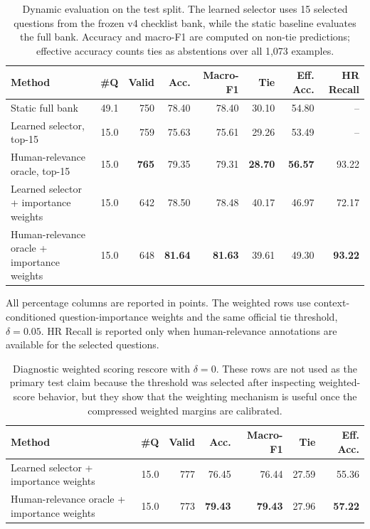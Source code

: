 \begin{table}[t]
\centering
\small
\caption{Dynamic evaluation on the test split. The learned selector uses 15 selected questions from the frozen v4 checklist bank, while the static baseline evaluates the full bank. Accuracy and macro-F1 are computed on non-tie predictions; effective accuracy counts ties as abstentions over all 1,073 examples.}
\label{tab:dynamic-eval-test}
\begin{tabular}{lrrrrrrr}
\toprule
Method & \#Q & Valid & Acc. & Macro-F1 & Tie & Eff. Acc. & HR Recall \\
\midrule
Static full bank & 49.1 & 750 & 78.40 & 78.40 & 30.10 & 54.80 & -- \\
Learned selector, top-15 & 15.0 & 759 & 75.63 & 75.61 & 29.26 & 53.49 & -- \\
Human-relevance oracle, top-15 & 15.0 & \textbf{765} & 79.35 & 79.31 & \textbf{28.70} & \textbf{56.57} & 93.22 \\
\midrule
Learned selector + importance weights & 15.0 & 642 & 78.50 & 78.48 & 40.17 & 46.97 & 72.17 \\
Human-relevance oracle + importance weights & 15.0 & 648 & \textbf{81.64} & \textbf{81.63} & 39.61 & 49.30 & \textbf{93.22} \\
\bottomrule
\end{tabular}
\vspace{2pt}

\footnotesize
All percentage columns are reported in points. The weighted rows use context-conditioned question-importance weights and the same official tie threshold, $\delta=0.05$. HR Recall is reported only when human-relevance annotations are available for the selected questions.
\end{table}

\begin{table}[t]
\centering
\small
\caption{Diagnostic weighted scoring rescore with $\delta=0$. These rows are not used as the primary test claim because the threshold was selected after inspecting weighted-score behavior, but they show that the weighting mechanism is useful once the compressed weighted margins are calibrated.}
\label{tab:weighted-td0-diagnostic}
\begin{tabular}{lrrrrrr}
\toprule
Method & \#Q & Valid & Acc. & Macro-F1 & Tie & Eff. Acc. \\
\midrule
Learned selector + importance weights & 15.0 & 777 & 76.45 & 76.44 & 27.59 & 55.36 \\
Human-relevance oracle + importance weights & 15.0 & 773 & \textbf{79.43} & \textbf{79.43} & 27.96 & \textbf{57.22} \\
\bottomrule
\end{tabular}
\end{table}
